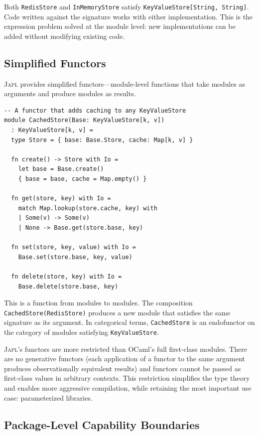 \documentclass[11pt,a4paper]{article}
\newcommand{\japl}{\textsc{Japl}}
\begin{document}
Both \texttt{RedisStore} and \texttt{InMemoryStore} satisfy \texttt{KeyValueStore[String, String]}. Code written against the signature works with either implementation. This is the expression problem solved at the module level: new implementations can be added without modifying existing code.

\subsection{Simplified Functors}

\japl{} provides simplified functors---module-level functions that take modules as arguments and produce modules as results.

\begin{lstlisting}
-- A functor that adds caching to any KeyValueStore
module CachedStore(Base: KeyValueStore[k, v])
  : KeyValueStore[k, v] =
  type Store = { base: Base.Store, cache: Map[k, v] }

  fn create() -> Store with Io =
    let base = Base.create()
    { base = base, cache = Map.empty() }

  fn get(store, key) with Io =
    match Map.lookup(store.cache, key) with
    | Some(v) -> Some(v)
    | None -> Base.get(store.base, key)

  fn set(store, key, value) with Io =
    Base.set(store.base, key, value)

  fn delete(store, key) with Io =
    Base.delete(store.base, key)
\end{lstlisting}

This is a function from modules to modules. The composition \texttt{CachedStore(RedisStore)} produces a new module that satisfies the same signature as its argument. In categorical terms, \texttt{CachedStore} is an endofunctor on the category of modules satisfying \texttt{KeyValueStore}.

\japl{}'s functors are more restricted than OCaml's full first-class modules. There are no generative functors (each application of a functor to the same argument produces observationally equivalent results) and functors cannot be passed as first-class values in arbitrary contexts. This restriction simplifies the type theory and enables more aggressive compilation, while retaining the most important use case: parameterized libraries.

\subsection{Package-Level Capability Boundaries}
\end{document}
